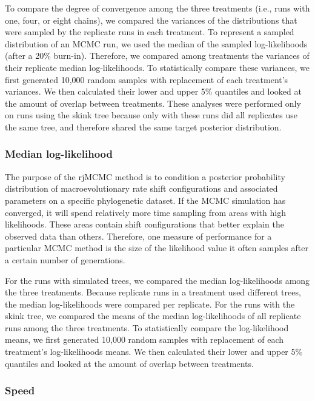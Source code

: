 \documentclass[12pt]{article}
\begin{document}
To compare the degree of convergence among the three treatments
(i.e., runs with one, four, or eight chains),
we compared the variances of the distributions
that were sampled by the replicate runs in each treatment.
%
To represent a sampled distribution of an MCMC run,
we used the median of the sampled log-likelihoods (after a 20\% burn-in).
%
Therefore, we compared among treatments
the variances of their replicate median log-likelihoods.
%
To statistically compare these variances,
we first generated 10,000 random samples with replacement
of each treatment's variances.
%
We then calculated their lower and upper 5\% quantiles
and looked at the amount of overlap between treatments.
%
These analyses were performed only on runs using the skink tree
because only with these runs did all replicates use the same tree,
and therefore shared the same target posterior distribution.


\subsubsection*{Median log-likelihood}

The purpose of the 
rjMCMC 
method is to condition a posterior probability distribution
of macroevolutionary rate shift configurations and associated 
parameters on a specific phylogenetic dataset.
%
If the MCMC simulation has converged,
it will spend relatively more time sampling
from areas with high likelihoods.
%
These areas contain shift configurations
that better explain the observed data than others.
%
Therefore, one measure of performance for a particular MCMC method
is the size of the likelihood value it often samples
after a certain number of generations.


For the runs with simulated trees,
we compared the median log-likelihoods
among the three treatments.
%
Because replicate runs in a treatment used different trees,
the median log-likelihoods were compared per replicate.
%
For the runs with the skink tree,
we compared the means of the median log-likelihoods
of all replicate runs among the three treatments.
%
To statistically compare the log-likelihood means,
we first generated 10,000 random samples with replacement
of each treatment's log-likelihoods means.
%
We then calculated their lower and upper 5\% quantiles
and looked at the amount of overlap between treatments.


\subsubsection*{Speed}
\end{document}
